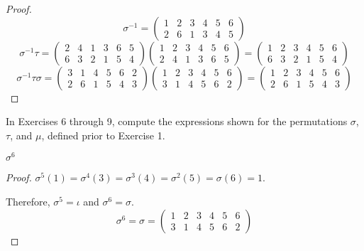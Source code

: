 \begin{proof}
    \[
        {\sigma}^{-1} =
        \begin{pmatrix}
            1 & 2 & 3 & 4 & 5 & 6 \\
            2 & 6 & 1 & 3 & 4 & 5
        \end{pmatrix}
    \]
    \[
        {\sigma}^{-1}\tau =
        \begin{pmatrix}
            2 & 4 & 1 & 3 & 6 & 5 \\
            6 & 3 & 2 & 1 & 5 & 4
        \end{pmatrix}
        \begin{pmatrix}
            1 & 2 & 3 & 4 & 5 & 6 \\
            2 & 4 & 1 & 3 & 6 & 5
        \end{pmatrix} =
        \begin{pmatrix}
            1 & 2 & 3 & 4 & 5 & 6 \\
            6 & 3 & 2 & 1 & 5 & 4
        \end{pmatrix}
    \]
    \[
        {\sigma}^{-1}\tau{\sigma} =
        \begin{pmatrix}
            3 & 1 & 4 & 5 & 6 & 2 \\
            2 & 6 & 1 & 5 & 4 & 3
        \end{pmatrix}
        \begin{pmatrix}
            1 & 2 & 3 & 4 & 5 & 6 \\
            3 & 1 & 4 & 5 & 6 & 2
        \end{pmatrix} =
        \begin{pmatrix}
            1 & 2 & 3 & 4 & 5 & 6 \\
            2 & 6 & 1 & 5 & 4 & 3
        \end{pmatrix}
    \]
\end{proof}

In Exercises 6 through 9, compute the expressions shown for the permutations $\sigma$, $\tau$, and $\mu$, defined prior to Exercise 1.

\newpage
\begin{exercise}
    $\sigma^{6}$
\end{exercise}

\begin{proof}
    $\sigma^{5}(1) = \sigma^{4}(3) = \sigma^{3}(4) = \sigma^{2}(5) = \sigma(6) = 1$.

    Therefore, $\sigma^{5} = \iota$ and $\sigma^{6} = \sigma$.
    \[
        \sigma^{6} = \sigma =
        \begin{pmatrix}
            1 & 2 & 3 & 4 & 5 & 6 \\
            3 & 1 & 4 & 5 & 6 & 2
        \end{pmatrix}
    \]
\end{proof}

